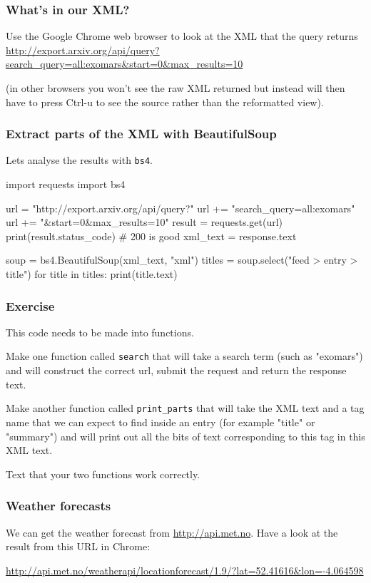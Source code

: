 \documentclass{beamer}
\begin{document}
\begin{frame}[fragile]
\frametitle{What's in our XML?}
Use the Google Chrome web browser to look at the XML that the query returns
\url{http://export.arxiv.org/api/query?search_query=all:exomars&start=0&max_results=10}

\bigskip

(in other browsers you won't see the raw XML returned but instead will then have to press Ctrl-u to see the source rather than the reformatted view).
\end{frame}


\begin{frame}[fragile]
\frametitle{Extract parts of the XML with BeautifulSoup}
Lets analyse the results with \texttt{bs4}.
\begin{code}
import requests
import bs4

url = "http://export.arxiv.org/api/query?" 
url += "search_query=all:exomars" 
url += "&start=0&max_results=10"
result = requests.get(url)
print(result.status_code) # 200 is good
xml_text = response.text

soup = bs4.BeautifulSoup(xml_text, "xml")
titles = soup.select("feed > entry > title")
for title in titles:
   print(title.text)
\end{code}
\end{frame}

\begin{frame}[fragile]
\frametitle{Exercise}
This code needs to be made into functions. 

\bigskip

Make one function called \texttt{search} that will take a search term (such as "exomars") and will construct the correct url, submit the request and return the response text.

\bigskip

Make another function called \texttt{print\_parts} that will take the XML text and a tag name that we can expect to find inside an entry (for example "title" or "summary") and will print out all the bits of text corresponding to this tag in this XML text.

\bigskip

Text that your two functions work correctly.
\end{frame}

\begin{frame}[fragile]
\frametitle{Weather forecasts}
We can get the weather forecast from \url{http://api.met.no}. Have a look at the result from this URL in Chrome:

\bigskip

\url{http://api.met.no/weatherapi/locationforecast/1.9/?lat=52.41616&lon=-4.064598}
\end{frame}
\end{document}

